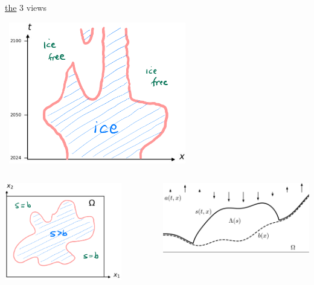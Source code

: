 \documentclass[10pt,dvipsnames]{beamer}
\begin{document}
\begin{frame}{\underline{the} 3 views}

\begin{center}
\mbox{\phantom{foisdfjs} \includegraphics[width=0.58\textwidth]{xtcrop}}
\end{center}

\begin{columns}
\begin{column}{0.4\textwidth}
\includegraphics[width=0.8\textwidth]{mapplane}
\end{column}
\begin{column}{0.5\textwidth}
\hfill \includegraphics[width=\textwidth]{stokesdomain}
\end{column}
\end{columns}
\end{frame}
\end{document}
